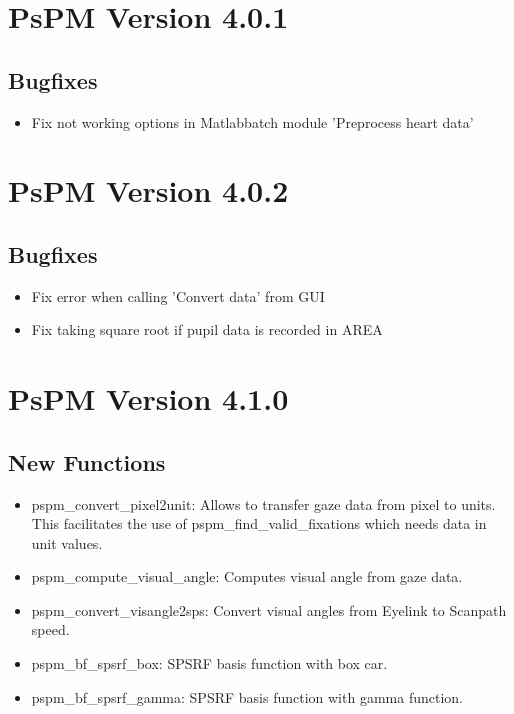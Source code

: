 \documentclass[english]{article}
\numberwithin{equation}{section}
\numberwithin{figure}{section}
\begin{document}
\section{PsPM Version 4.0.1}

\subsection*{Bugfixes}
\begin{itemize}
\item Fix not working options in Matlabbatch module 'Preprocess heart data'
\end{itemize}

\section{PsPM Version 4.0.2}

\subsection*{Bugfixes}
\begin{itemize}
\item Fix error when calling 'Convert data' from GUI
\item Fix taking square root if pupil data is recorded in AREA
\end{itemize}

\section{PsPM Version 4.1.0}

\subsection*{New Functions}
\begin{itemize}
\item pspm\_convert\_pixel2unit: Allows to transfer gaze data from pixel
to units. This facilitates the use of pspm\_find\_valid\_fixations
which needs data in unit values.
\item pspm\_compute\_visual\_angle: Computes visual angle from gaze data.
\item pspm\_convert\_visangle2sps: Convert visual angles from Eyelink to
Scanpath speed.
\item pspm\_bf\_spsrf\_box: SPSRF basis function with box car.
\item pspm\_bf\_spsrf\_gamma: SPSRF basis function with gamma function.
\end{itemize}
\end{document}
